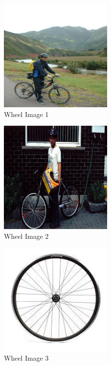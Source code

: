 \newpage
\newpage

\begin{figure}[h]
   \centering
   \includegraphics[width=0.5\textwidth]{../test-pictures/wheel/wheel1.jpg}
   \caption{Wheel Image 1}
   \label{fig:wheel1}
\end{figure}


\begin{figure}[h]
   \centering
   \includegraphics[width=0.5\textwidth]{../test-pictures/wheel/wheel2.jpg}
   \caption{Wheel Image 2}
   \label{fig:wheel2}
\end{figure}

\begin{figure}[h]
   \centering
   \includegraphics[width=0.5\textwidth]{../test-pictures/wheel/wheel3.jpg}
   \caption{Wheel Image 3}
   \label{fig:wheel3}
\end{figure}

